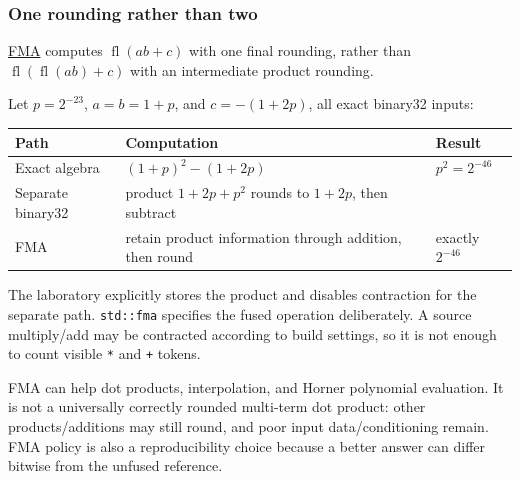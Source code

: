 \subsubsection{One rounding rather than two}\label{05-engine-i-ch001-one-rounding-rather-than-two}

\hyperref[appendix-41e8ef22a21e]{FMA} computes \(\operatorname{fl}(ab+c)\) with one final rounding, rather than \(\operatorname{fl}(\operatorname{fl}(ab)+c)\) with an intermediate product rounding.

Let \(p=2^{-23}\), \(a=b=1+p\), and \(c=-(1+2p)\), all exact binary32 inputs:

{\def\LTcaptype{none} %
\begin{longtable}[]{@{}
  >{\raggedright\arraybackslash}p{}
  >{\raggedright\arraybackslash}p{}
  >{\raggedright\arraybackslash}p{}@{}}
\toprule\noalign{}
\begin{minipage}[b]{\linewidth}\raggedright
Path
\end{minipage} & \begin{minipage}[b]{\linewidth}\raggedright
Computation
\end{minipage} & \begin{minipage}[b]{\linewidth}\raggedright
Result
\end{minipage} \\
\midrule\noalign{}
\endhead
\bottomrule\noalign{}
\endlastfoot
Exact algebra & \((1+p)^2-(1+2p)\) & \(p^2=2^{-46}\) \\
Separate binary32 & product \(1+2p+p^2\) rounds to \(1+2p\), then subtract & 0 \\
FMA & retain product information through addition, then round & exactly \(2^{-46}\) \\
\end{longtable}
}

The laboratory explicitly stores the product and disables contraction for the separate path. \texttt{std::fma} specifies the fused operation deliberately. A source multiply/add may be contracted according to build settings, so it is not enough to count visible \texttt{*} and \texttt{+} tokens.

FMA can help dot products, interpolation, and Horner polynomial evaluation. It is not a universally correctly rounded multi-term dot product: other products/additions may still round, and poor input data/conditioning remain. FMA policy is also a reproducibility choice because a better answer can differ bitwise from the unfused reference.

